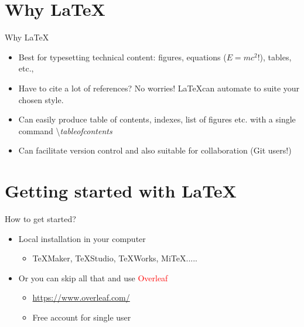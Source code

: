 
% 

\section{Why \LaTeX}
\label{sec:introduction}
\frame[plain]{\sectionpage}


\begin{frame}{Why \LaTeX}
    \begin{itemize}
        \item<1-> Best for typesetting technical content: figures, equations ($E=mc^2!$), tables, etc.,
        \item <2->Have to cite a lot of references? No worries! \LaTeX can automate to suite your chosen style. 
        \item <3->Can easily produce table of contents, indexes, list of figures etc. with a single command \textbackslash\textit{tableofcontents} 
        \item<4-> Can facilitate version control and also suitable for collaboration (Git users!)
        \
    \end{itemize}
\end{frame}

\section{Getting started with \LaTeX}
\label{sec:introduction}
\frame[plain]{\sectionpage}


\begin{frame}{How to get started?}
    \begin{itemize}
        \item<1-> Local installation in your computer 
        \begin{itemize}
            \item TeXMaker, TeXStudio, TeXWorks, MiTeX..... 
        \end{itemize}
         \vspace{5em}
        \item <2-> Or you can skip all that and use \textcolor{red}{Overleaf}
        \begin{itemize}
            \item \href{https://www.overleaf.com/}{https://www.overleaf.com/}
            \item Free account for single user
        \end{itemize}
        
    \end{itemize}
\end{frame}

